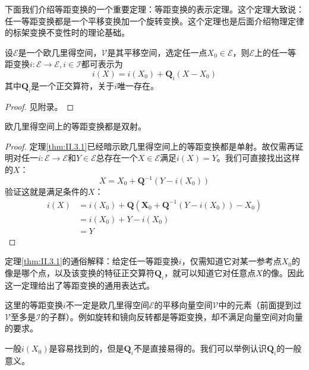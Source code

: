 \documentclass[main.tex]{subfiles}
\begin{document}
下面我们介绍等距变换的一个重要定理：等距变换的表示定理。这个定理大致说：任一等距变换都是一个平移变换加一个旋转变换。这个定理也是后面介绍物理定律的标架变换不变性时的理论基础。

\begin{theorem}[等距变换的表示定理]\label{thm:II.3.1}
    设$\mathcal{E}$是一个欧几里得空间，$\mathcal{V}$是其平移空间，选定任一点$X_0\in\mathcal{E}$，则$\mathcal{E}$上的任一等距变换$i:\mathcal{E}\rightarrow\mathcal{E},i\in\mathcal{I}$都可表示为
    \[
        i\left(X\right)=i\left(X_0\right)+\mathbf{Q}_i\left(X-X_0\right)
    \]
    其中$\mathbf{Q}_i$是一个正交算符，关于$i$唯一存在。
\end{theorem}
\begin{proof}
    见附录。
\end{proof}

\begin{corollary}
    欧几里得空间上的等距变换都是双射。
\end{corollary}
\begin{proof}
    定理\ref{thm:II.3.1}已经暗示欧几里得空间上的等距变换都是单射。故仅需再证明对任一$i:
        \mathcal{E}\rightarrow\mathcal{E}$和$Y\in\mathcal{E}$总存在一个$X\in\mathcal{E}$满足$i\left(X\right)=Y$。我们可直接找出这样的$X$：
    \[
        X=X_0+\mathbf{Q}^{-1}\left(Y-i\left(X_0\right)\right)
    \]
    验证这就是满足条件的$X$：
    \begin{align*}
        i\left(X\right) & =i\left(X_0\right)+\mathbf{Q}\left(\mathbf{X}_0+\mathbf{Q}^{-1}\left(Y-i\left(X_0\right)\right)-X_0\right) \\
                        & =i\left(X_0\right)+Y-i\left(X_0\right)                                                                     \\
                        & =Y
    \end{align*}
\end{proof}

定理\ref{thm:II.3.1}的通俗解释：给定任一等距变换$i$，仅需知道它对某一参考点$X_0$的像是哪个点，以及该变换的特征正交算符$\mathbf{Q}_i$，就可以知道它对任意点$X$的像。因此这一定理给出了等距变换的通用表达式。

这里的等距变换$i$不一定是欧几里得空间$\mathcal{E}$的平移向量空间$\mathcal{V}$中的元素（前面提到过$\mathcal{V}$至多是$\mathcal{I}$的子群）。例如旋转和镜向反转都是等距变换，却不满足向量空间对向量的要求。

一般$i\left(X_0\right)$是容易找到的，但是$\mathbf{Q}_i$不是直接易得的。我们可以举例认识$\mathbf{Q}_i$的一般意义。
\end{document}

